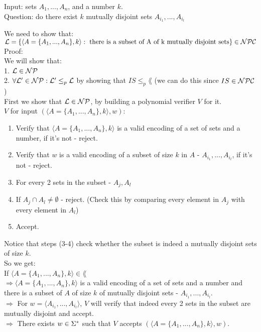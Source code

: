 Input: sets $A_1, ..., A_n$, and a number $k$. \\
Question: do there exist $k$ mutually disjoint sets $A_{i_1} , ..., A_{i_l}$

We need to show that: \\
$\mathcal{L} = \{\langle A = \{A_1, ..., A_n\}, k \rangle: \text{ there is a subset
        of A of k mutually disjoint sets}\} \in \mathcal{N}\mathcal{P}\mathcal{C}$ \\

Proof: \\
We will show that: \\
1. $\mathcal{L} \in \mathcal{N}\mathcal{P}$ \\
2. $\forall \mathcal{L}' \in \mathcal{N}\mathcal{P}: \mathcal{L}' \leq_p \mathcal{L}$ by showing that $IS \leq_p \lang$ (we can do this since $IS \in \mathcal{N}\mathcal{P}\mathcal{C}$) \\

First we show that $\mathcal{L} \in \mathcal{N}\mathcal{P}$, by building a polynomial verifier $V$ for it. \\
$V$ for input $(\langle A = \{A_1, ..., A_n\}, k \rangle, w)$:
\begin{enumerate}[1., itemsep=5pt]
    \item Verify that $\langle A = \{A_1, ..., A_n\}, k \rangle$ is a valid encoding of a set of sets and a number, if it's not - reject.
    \item Verify that $w$ is a valid encoding of a subset of size $k$ in $A$ - $A_{i_1} , ..., A_{i_l}$, if it's not - reject.

    \item For every 2 sets in the subset - $A_j, A_l$
    \item \qquad If $A_j \cap A_l \neq \emptyset$ - reject. (Check this by comparing every element in $A_j$ with every element in $A_l$)

    \item Accept.

\end{enumerate}

Notice that steps (3-4) check whether the subset is indeed a mutually disjoint sets of size $k$.\\

So we get: \\
If $\langle A = \{A_1, ..., A_n\}, k \rangle \in \lang$ \\
$\Rightarrow \langle A = \{A_1, ..., A_n\}, k \rangle$ is a valid encoding of a set of sets and a number
and there is a subset of $A$ of size $k$ of mutually disjoint sets - $A_{i_1} , ..., A_{i_l}$.\\
$\Rightarrow $ For $w=\langle A_{i_1} , ..., A_{i_l} \rangle$, $V$ will verify that indeed every 2 sets in the
subset are mutually disjoint and accept. \\
$\Rightarrow $ There exists $w \in \Sigma^*$ such that $V$ accepts $(\langle A = \{A_1, ..., A_n\}, k \rangle, w)$. \\

